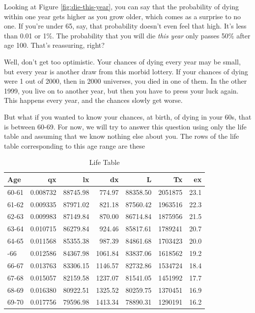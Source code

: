 \documentclass[
  openany]{book}
\begin{document}
Looking at Figure \ref{fig:die-this-year}, you can say that the probability of dying within one year gets higher as you grow older, which comes as a surprise to no one. If you're under 65, say, that probability doesn't even feel that high. It's less than 0.01 or 1\%. The probability that you will die \emph{this year} only passes 50\% after age 100. That's reassuring, right?

Well, don't get too optimistic. Your chances of dying every year may be small, but every year is another draw from this morbid lottery. If your chances of dying were 1 out of 2000, then in 2000 universes, you died in one of them. In the other 1999, you live on to another year, but then you have to press your luck again. This happens every year, and the chances slowly get worse.

But what if you wanted to know your chances, at birth, of dying in your 60s, that is between 60-69. For now, we will try to answer this question using only the life table and assuming that we know nothing else about you. The rows of the life table corresponding to this age range are these

\begin{table}[!h]

\caption{\label{tab:survival}Life Table}
\centering
\begin{tabular}[t]{lrrrrrr}
\toprule
Age & qx & lx & dx & L & Tx & ex\\
\midrule
60-61 & 0.008732 & 88745.98 & 774.97 & 88358.50 & 2051875 & 23.1\\
61-62 & 0.009335 & 87971.02 & 821.18 & 87560.42 & 1963516 & 22.3\\
62-63 & 0.009983 & 87149.84 & 870.00 & 86714.84 & 1875956 & 21.5\\
63-64 & 0.010715 & 86279.84 & 924.46 & 85817.61 & 1789241 & 20.7\\
64-65 & 0.011568 & 85355.38 & 987.39 & 84861.68 & 1703423 & 20.0\\
\addlinespace
65-66 & 0.012586 & 84367.98 & 1061.84 & 83837.06 & 1618562 & 19.2\\
66-67 & 0.013763 & 83306.15 & 1146.57 & 82732.86 & 1534724 & 18.4\\
67-68 & 0.015057 & 82159.58 & 1237.07 & 81541.05 & 1451992 & 17.7\\
68-69 & 0.016380 & 80922.51 & 1325.52 & 80259.75 & 1370451 & 16.9\\
69-70 & 0.017756 & 79596.98 & 1413.34 & 78890.31 & 1290191 & 16.2\\
\bottomrule
\end{tabular}
\end{table}
\end{document}
